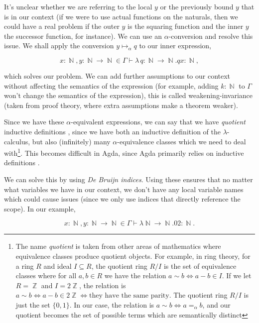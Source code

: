 \documentclass[logo,bsc,singlespacing,parskip,online]{infthesis}
\DeclareMathOperator{\nat}{\mathbb{N}}
\DeclareMathOperator{\integer}{\mathbb{Z}}
\begin{document}
It's unclear whether we are referring to the local $y$ or the previously bound
$y$ that is in our context (if we were to use actual functions on the naturals,
then we could have a real problem if the outer $y$ is the squaring function and
the inner $y$ the successor function, for instance). We can use an
$\alpha$-conversion and resolve this issue. We shall apply the conversion $y
\mapsto_{\alpha} q$ to our inner expression,

\begin{equation*}
  x \colon \nat, y \colon \nat \to \nat \in \Gamma \vdash \lambda \, q \colon \nat \to \nat. q x \colon \nat,
\end{equation*}

which solves our problem. We can add further assumptions to our context without
affecting the semantics of the expression (for example, adding $k \colon \nat$
to $\Gamma$ won't change the semantics of the expression), this is called
weakening-invariance (taken from proof theory, where extra assumptions make a
theorem weaker).

Since we have these $\alpha$-equivalent expressions, we can say that we have
\textit{quotient} inductive definitions \citep{aydemir_engineering_2008}, since
we have both an inductive definition of the $\lambda$-calculus, but also
(infinitely) many $\alpha$-equivalence classes which we need to deal
with\footnote{The name \textit{quotient} is taken from other areas of
mathematics where equivalence classes produce quotient objects. For example, in
ring theory, for a ring $R$ and ideal $I \subseteq R$, the quotient ring $R/I$
is the set of equivalence classes where for all $a, b \in R$ we have the
relation $a \sim b \iff a - b \in I$. If we let $R = \integer$ and $I =
2\integer$, the relation is $a \sim b \iff a - b \in 2\integer \iff \text{they
have the same parity}$. The quotient ring $R/I$ is just the set $\{0, 1\}$. In
our case, the relation is $a \sim b \iff a =_{\alpha} b$, and our quotient
becomes the set of possible terms which are semantically distinct}. This becomes
difficult in Agda, since Agda primarily relies on inductive definitions
\citep{pitts_locally_2023}.

We can solve this by using \textit{De Bruijn indices}. Using these ensures that
no matter what variables we have in our context, we don't have any local
variable names which could cause issues (since we only use indices that directly
reference the scope). In our example,

\begin{equation*}
  x \colon \nat, y \colon \nat \to \nat \in \Gamma \vdash \lambda \nat \to \nat. 0 2 \colon \nat.
\end{equation*}
\end{document}
